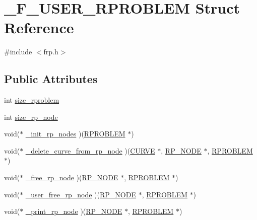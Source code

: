 \hypertarget{struct___f___u_s_e_r___r_p_r_o_b_l_e_m}{}\section{\+\_\+\+F\+\_\+\+U\+S\+E\+R\+\_\+\+R\+P\+R\+O\+B\+L\+EM Struct Reference}
\label{struct___f___u_s_e_r___r_p_r_o_b_l_e_m}


{\ttfamily \#include $<$frp.\+h$>$}

\subsection*{Public Attributes}
\begin{DoxyCompactItemize}
\item 
int \hyperlink{struct___f___u_s_e_r___r_p_r_o_b_l_e_m_a7fc632d2b1dc9b15044d4e63bfa0df50}{size\+\_\+rproblem}
\item 
int \hyperlink{struct___f___u_s_e_r___r_p_r_o_b_l_e_m_afd2b24532e9baccaeda4a297e0ae63c3}{size\+\_\+rp\+\_\+node}
\item 
void($\ast$ \hyperlink{struct___f___u_s_e_r___r_p_r_o_b_l_e_m_a54e9d9eb698972d4a278484c67a16211}{\+\_\+init\+\_\+rp\+\_\+nodes} )(\hyperlink{frp_8h_a8e39ec4bf8bcc03a2e164b2ab39b9b33}{R\+P\+R\+O\+B\+L\+EM} $\ast$)
\item 
void($\ast$ \hyperlink{struct___f___u_s_e_r___r_p_r_o_b_l_e_m_af7f10000c441409d2b3c9795df3ced14}{\+\_\+delete\+\_\+curve\+\_\+from\+\_\+rp\+\_\+node} )(\hyperlink{int_8h_a4c1c272bef898dbaa20b055af85cd685}{C\+U\+R\+VE} $\ast$, \hyperlink{frp_8h_ad37baa973dc0759df1cd3e455f890ddf}{R\+P\+\_\+\+N\+O\+DE} $\ast$, \hyperlink{frp_8h_a8e39ec4bf8bcc03a2e164b2ab39b9b33}{R\+P\+R\+O\+B\+L\+EM} $\ast$)
\item 
void($\ast$ \hyperlink{struct___f___u_s_e_r___r_p_r_o_b_l_e_m_afeadcb230eea5674da035ce1ae596e0c}{\+\_\+free\+\_\+rp\+\_\+node} )(\hyperlink{frp_8h_ad37baa973dc0759df1cd3e455f890ddf}{R\+P\+\_\+\+N\+O\+DE} $\ast$, \hyperlink{frp_8h_a8e39ec4bf8bcc03a2e164b2ab39b9b33}{R\+P\+R\+O\+B\+L\+EM} $\ast$)
\item 
void($\ast$ \hyperlink{struct___f___u_s_e_r___r_p_r_o_b_l_e_m_a7aa0e8d6f1de7fbfb36017480470a660}{\+\_\+user\+\_\+free\+\_\+rp\+\_\+node} )(\hyperlink{frp_8h_ad37baa973dc0759df1cd3e455f890ddf}{R\+P\+\_\+\+N\+O\+DE} $\ast$, \hyperlink{frp_8h_a8e39ec4bf8bcc03a2e164b2ab39b9b33}{R\+P\+R\+O\+B\+L\+EM} $\ast$)
\item 
void($\ast$ \hyperlink{struct___f___u_s_e_r___r_p_r_o_b_l_e_m_ae374cbf991dca9e6e49292e3426c4158}{\+\_\+print\+\_\+rp\+\_\+node} )(\hyperlink{frp_8h_ad37baa973dc0759df1cd3e455f890ddf}{R\+P\+\_\+\+N\+O\+DE} $\ast$, \hyperlink{frp_8h_a8e39ec4bf8bcc03a2e164b2ab39b9b33}{R\+P\+R\+O\+B\+L\+EM} $\ast$)

\end{DoxyCompactItemize}
